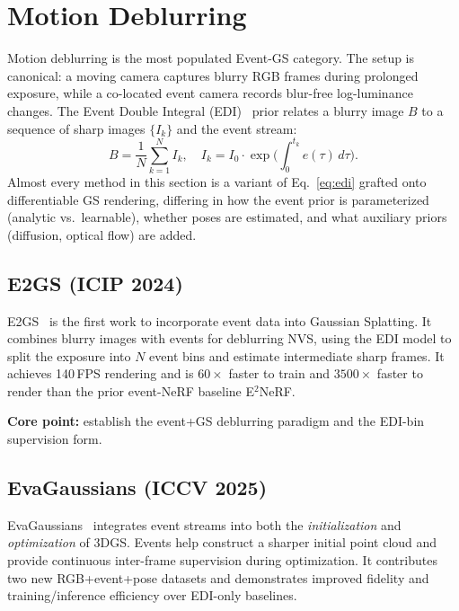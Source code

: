 \section{Motion Deblurring}
\label{sec:deblurring}

Motion deblurring is the most populated Event-GS category. The setup is canonical: a moving camera captures blurry RGB frames during prolonged exposure, while a co-located event camera records blur-free log-luminance changes. The Event Double Integral (EDI)~\cite{pan2019edi} prior relates a blurry image $B$ to a sequence of sharp images $\{I_k\}$ and the event stream:
\begin{equation}
    B = \frac{1}{N}\sum_{k=1}^{N} I_k, \quad I_k = I_0 \cdot \exp\!\Big(\int_0^{t_k} e(\tau)\,d\tau\Big).
    \label{eq:edi}
\end{equation}
Almost every method in this section is a variant of Eq.~\eqref{eq:edi} grafted onto differentiable GS rendering, differing in how the event prior is parameterized (analytic vs.\ learnable), whether poses are estimated, and what auxiliary priors (diffusion, optical flow) are added.

\subsection{E2GS (ICIP 2024)}
\label{sec:deblur:e2gs}

E2GS~\cite{deguchi2024e2gs} is the first work to incorporate event data into Gaussian Splatting. It combines blurry images with events for deblurring NVS, using the EDI model to split the exposure into $N$ event bins and estimate intermediate sharp frames. It achieves 140\,FPS rendering and is $60\times$ faster to train and $3500\times$ faster to render than the prior event-NeRF baseline E$^2$NeRF.

\textbf{Core point:} establish the event+GS deblurring paradigm and the EDI-bin supervision form.

\subsection{EvaGaussians (ICCV 2025)}
\label{sec:deblur:evagaussians}

EvaGaussians~\cite{yu2025evagaussians} integrates event streams into both the \emph{initialization} and \emph{optimization} of 3DGS. Events help construct a sharper initial point cloud and provide continuous inter-frame supervision during optimization. It contributes two new RGB+event+pose datasets and demonstrates improved fidelity and training/inference efficiency over EDI-only baselines.

